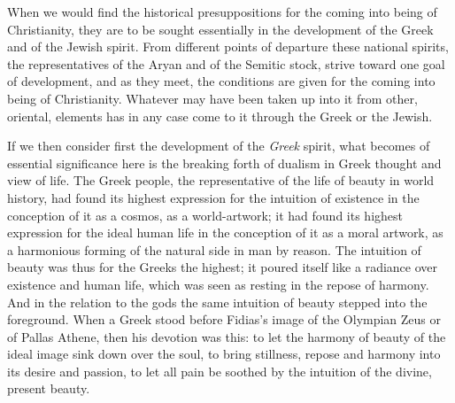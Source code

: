 \documentclass[12pt,a4paper,openany]{book}
\newcommand{\opage}[1]{\marginnote{\footnotesize\textit{[#1]}}}
\begin{document}
When we would find the historical presuppositions for
the coming into being of Christianity, they are to be sought essentially in the development
of the Greek and of the Jewish spirit. From different
\opage{443}points of departure these national spirits, the representatives
of the Aryan and of the Semitic stock, strive toward one goal of development,
and as they meet, the conditions are given for
the coming into being of Christianity. Whatever may have been taken up into it
from other, oriental, elements has in any case
come to it through the Greek or the Jewish.

If we then consider first the development of the \emph{Greek} spirit,
what becomes of essential significance here is the breaking forth of dualism
in Greek thought and view of life. The Greek people,
the representative of the life of beauty in world history, had found
its highest expression for the intuition of existence in the conception
of it as a cosmos, as a world-artwork; it had
found its highest expression for the ideal human life in the conception
of it as a moral artwork, as a harmonious
forming of the natural side in man by reason. The intuition of beauty
was thus for the Greeks the highest; it
poured itself like a radiance over existence and human life,
which was seen as resting in the repose of harmony. And in the relation
to the gods the same intuition of beauty stepped
into the foreground. When a Greek stood before Fidias's
image of the Olympian Zeus or of Pallas Athene, then
his devotion was this: to let the harmony of beauty of the ideal image
sink down over the soul, to bring stillness, repose and
harmony into its desire and passion, to let all pain
be soothed by the intuition of the divine, present
beauty.
\end{document}

